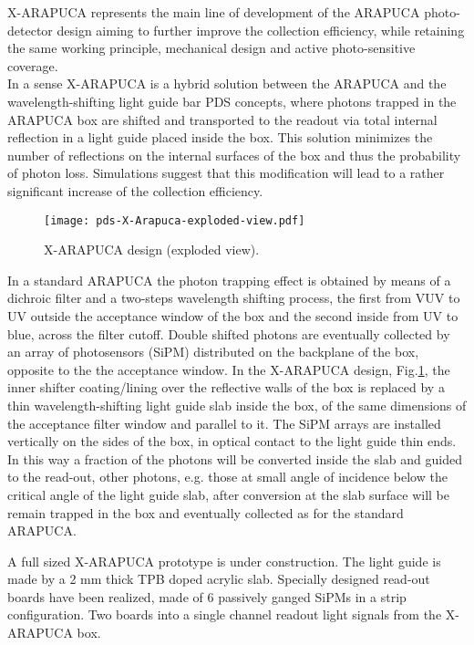 X-ARAPUCA represents the main line of development of the ARAPUCA photo-detector design aiming to further improve the collection efficiency, while retaining the same working
 principle, mechanical design and active  photo-sensitive coverage.\\
In a sense X-ARAPUCA is a hybrid solution between the ARAPUCA and the wavelength-shifting light guide bar PDS concepts, 
where photons trapped in the ARAPUCA box are shifted and transported to the readout via total internal reflection in a light guide placed inside the box.
This solution minimizes the number of reflections on the internal surfaces of the box and thus the probability of photon loss. Simulations suggest that
 this modification will lead to a rather significant increase of the collection efficiency.
 \begin{figure}[htbp]
\begin{center}
    \texttt{[image: pds-X-Arapuca-exploded-view.pdf]}
 \vspace{-2.5cm}
\caption{X-ARAPUCA design (exploded view).}
\label{fig:exploded}
\end{center}
\end{figure}

 In a standard ARAPUCA the photon trapping effect is obtained by means of a dichroic filter and a two-steps wavelength shifting process, the first from VUV to UV outside the acceptance window of the box and the second inside from UV to blue, across the filter cutoff. Double shifted photons are eventually collected by an array of photosensors (SiPM) distributed on the backplane of the box, opposite to the the acceptance window. In the X-ARAPUCA design, Fig.\ref{fig:exploded}, the inner shifter coating/lining over the reflective walls of the box is replaced by a thin wavelength-shifting light guide slab inside the box, of the same dimensions of the acceptance filter window and parallel to it. The SiPM arrays are installed vertically on the sides of the box, in optical contact to the light guide thin ends. 
 In this way a fraction of the photons will be converted inside the slab and guided to the read-out, other photons,  e.g. those at small angle of incidence below the critical angle of the light guide slab, after conversion at the slab surface will be remain trapped in the box and eventually collected as for the standard ARAPUCA.
 
 A full sized X-ARAPUCA prototype is under construction. The light guide is made by a 2 mm thick TPB doped acrylic slab. Specially designed read-out boards have been realized, made of 6 passively ganged SiPMs in a strip configuration.  Two boards into a single channel readout light signals from the X-ARAPUCA box.  \\
 
